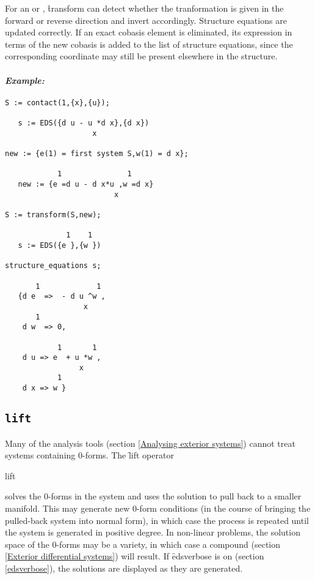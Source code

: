 For an  or , \f{transform} can detect whether the
tranformation is given in the forward or reverse direction and invert
accordingly. Structure equations are updated correctly. If an exact cobasis
element is eliminated, its expression in terms of the new cobasis is added
to the list of structure equations, since the corresponding coordinate may
still be present elsewhere in the structure.

\paragraph{\it Example:}
\begin{verbatim}
S := contact(1,{x},{u});

   s := EDS({d u - u *d x},{d x})
                    x

new := {e(1) = first system S,w(1) = d x};

            1               1
   new := {e =d u - d x*u ,w =d x}
                         x 

S := transform(S,new);

              1    1
   s := EDS({e },{w }) 

structure_equations s;

       1             1
   {d e  =>  - d u ^w ,
                  x 
       1
    d w  => 0, 

            1       1
    d u => e  + u *w ,
                 x 
            1
    d x => w }
\end{verbatim}

\subsection{\tt lift}
\label{lift}

Many of the analysis tools (section \ref{Analysing exterior systems})
cannot treat systems containing 0-forms. The \f{lift} operator
\begin{syntax}
	lift 
\end{syntax}
solves the 0-forms in the system and uses the solution to pull back to a
smaller manifold. This may generate new 0-form conditions (in the course of
bringing the pulled-back system into normal form), in which case the
process is repeated until the system is generated in positive degree. In
non-linear problems, the solution space of the 0-forms may be a variety, in
which case a compound  (section \ref{Exterior differential
systems}) will result. If \f{edsverbose} is on (section \ref{edsverbose}),
the solutions are displayed as they are generated.

